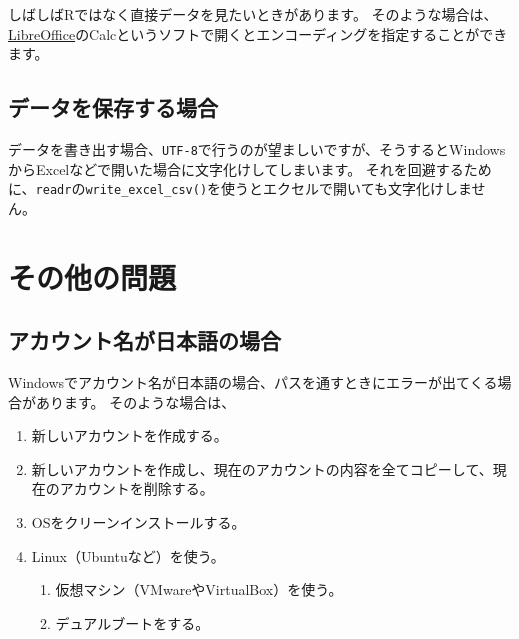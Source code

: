 \documentclass[]{bxjsreport}
\providecommand{\tightlist}{%
  \setlength{\itemsep}{0pt}\setlength{\parskip}{0pt}}
\let\asdf\section
\renewcommand{\section}{\chapter}
\let\asdff\subsection
\renewcommand{\subsection}{\asdf}
\renewcommand{\subsubsection}{\asdff}
\begin{document}
しばしばRではなく直接データを見たいときがあります。
そのような場合は、\href{https://ja.libreoffice.org/}{LibreOffice}のCalcというソフトで開くとエンコーディングを指定することができます。

\hypertarget{ux30c7ux30fcux30bfux3092ux4fddux5b58ux3059ux308bux5834ux5408}{%
\subsubsection{データを保存する場合}\label{ux30c7ux30fcux30bfux3092ux4fddux5b58ux3059ux308bux5834ux5408}}

データを書き出す場合、\texttt{UTF-8}で行うのが望ましいですが、そうするとWindowsからExcelなどで開いた場合に文字化けしてしまいます。
それを回避するために、\texttt{readr}の\texttt{write\_excel\_csv()}を使うとエクセルで開いても文字化けしません。

\hypertarget{Others}{%
\subsection{その他の問題}\label{Others}}

\hypertarget{ux30a2ux30abux30a6ux30f3ux30c8ux540dux304cux65e5ux672cux8a9eux306eux5834ux5408}{%
\subsubsection{アカウント名が日本語の場合}\label{ux30a2ux30abux30a6ux30f3ux30c8ux540dux304cux65e5ux672cux8a9eux306eux5834ux5408}}

Windowsでアカウント名が日本語の場合、パスを通すときにエラーが出てくる場合があります。
そのような場合は、

\begin{enumerate}
\def\labelenumi{\arabic{enumi}.}
\tightlist
\item
  新しいアカウントを作成する。
\item
  新しいアカウントを作成し、現在のアカウントの内容を全てコピーして、現在のアカウントを削除する。
\item
  OSをクリーンインストールする。
\item
  Linux（Ubuntuなど）を使う。

  \begin{enumerate}
  \def\labelenumii{\arabic{enumii}.}
  \tightlist
  \item
    仮想マシン（VMwareやVirtualBox）を使う。
  \item
    デュアルブートをする。
  \end{enumerate}
\end{enumerate}
\end{document}
